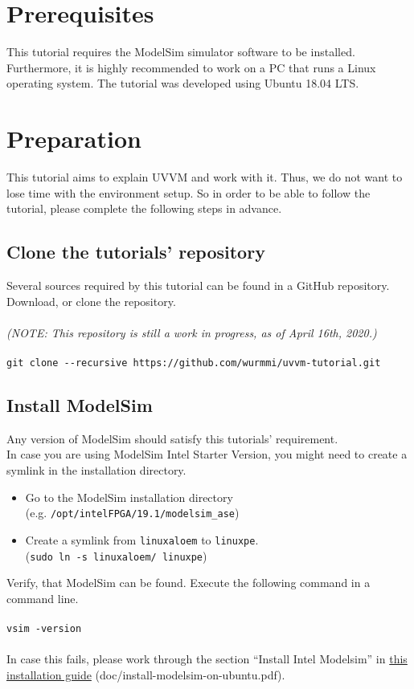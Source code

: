 \section{Prerequisites}

This tutorial requires the ModelSim simulator software to be installed.
Furthermore, it is highly recommended to work on a PC that runs a Linux operating system. The tutorial was developed using Ubuntu 18.04 LTS.

\section{Preparation}

This tutorial aims to explain UVVM and work with it.
Thus, we do not want to lose time with the environment setup.
So in order to be able to follow the tutorial, please complete the
following steps in advance.

\subsection{Clone the tutorials' repository}

Several sources required by this tutorial can be found in a GitHub repository.\\
Download, or clone the repository.\\
\\
\textit{(NOTE: This repository is still a work in progress, as of April 16th, 2020.)}
\\
\\
\texttt{git clone -{}-recursive https://github.com/wurmmi/uvvm-tutorial.git }\\


\subsection{Install ModelSim}

Any version of ModelSim should satisfy this tutorials' requirement.\\

In case you are using ModelSim Intel Starter Version, you might need to
create a symlink in the installation directory.
\begin{itemize}
      \item Go to the ModelSim installation directory\\
            (e.g. \texttt{/opt/intelFPGA/19.1/modelsim\_ase})
      \item Create a symlink from \texttt{linuxaloem} to \texttt{linuxpe}.\\
            (\texttt{sudo ln -s linuxaloem/ linuxpe})
\end{itemize}

Verify, that ModelSim can be found. Execute the following command in a command line.\\
\\
\texttt{vsim -version}\\
\\
In case this fails, please work through the section ``Install Intel Modelsim''
in \href{../install-modelsim-on-ubuntu.pdf}{this installation guide} (doc/install-modelsim-on-ubuntu.pdf).

\newpage
